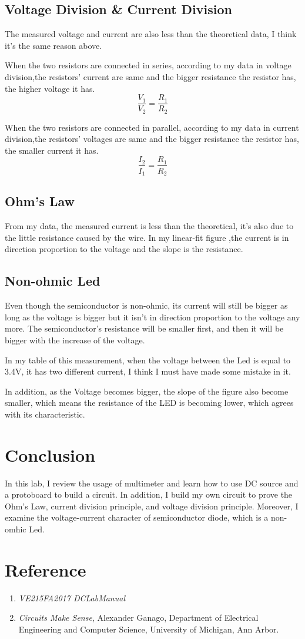 \documentclass[12pt]{article}
\begin{document}
\subsection{Voltage Division \& Current Division}
\par The measured voltage and current are also less than the theoretical data, I think it's the same reason above.
\par When the two resistors are connected in series, according to my data in voltage division,the resistors' current are same and the bigger resistance the resistor has, the higher  voltage it has.$$\frac{V_1}{V_2}=\frac{R_1}{R_2}$$
\par When the two resistors are connected in parallel, according to my data in current division,the resistors' voltages are same and the bigger resistance the resistor has, the smaller current it has.$$\frac{I_2}{I_1}=\frac{R_1}{R_2}$$ 
\subsection{Ohm's Law}
From my data, the measured current is less than the theoretical, it's also due to the little resistance caused by the wire. In my linear-fit figure ,the current is in direction proportion to the voltage and the slope is the resistance.
\subsection{Non-ohmic Led}
Even though the semiconductor is non-ohmic, its current will still be bigger as long as the voltage is bigger but it isn't in direction proportion to the voltage any more. The semiconductor's resistance will be smaller first, and then it will be bigger with the increase of the voltage.
\par In my table of this measurement, when the voltage between the Led is equal to 3.4V, it has two different current, I think I must have made some mistake in it. 
\par In addition, as the Voltage becomes bigger, the slope of the figure also become smaller, which means the resistance of the LED is becoming lower, which agrees with its characteristic.
\section{Conclusion}
In this lab, I review the usage of multimeter and learn how to use DC source and a protoboard to build a circuit. In addition, I build my own circuit to prove the Ohm's Law, current division  principle, and voltage division principle. Moreover, I examine the voltage-current character of semiconductor diode, which is a non-omhic Led.
\section{Reference}
\begin{enumerate}[-]
\item \emph{VE215FA2017 DCLabManual} 
\item \emph{Circuits Make Sense}, Alexander Ganago, Department of Electrical Engineering and Computer Science, University of Michigan, Ann Arbor.
\end{enumerate}
\end{document}
